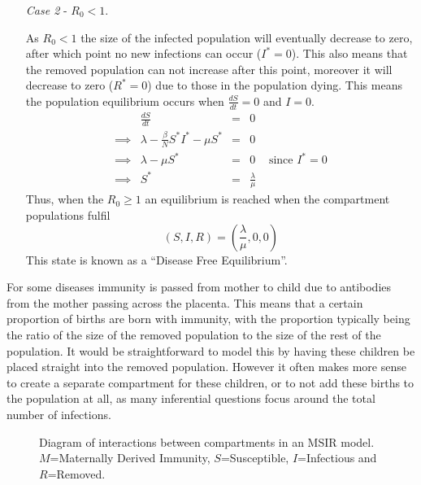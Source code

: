 \documentclass[11pt,a4paper]{article}
\theoremstyle{break}
\begin{document}
\begin{box_remark}
\begin{itemize}
      \item[\textit{Case 2}] - $R_0<1$.
      \par As $R_0<1$ the size of the infected population will eventually decrease to zero, after which point no new infections can occur ($I^*=0$). This also means that the removed population can not increase after this point, moreover it will decrease to zero ($R^*=0$) due to those in the population dying. This means the population equilibrium occurs when $\frac{dS}{dt}=0$ and $I=0$.
      \[\begin{array}{rrcll}
        &\frac{dS}{dt}&=&0\\
        \implies&\lambda-\frac\beta{N} S^*I^*-\mu S^*&=&0&\\
        \implies&\lambda-\mu S^*&=&0&\text{ since }I^*=0\\
        \implies&S^*&=&\frac\lambda\mu
      \end{array}\]
      Thus, when the $R_0\geq1$ an equilibrium is reached when the compartment populations fulfil
      \[ (S,I,R)=\left(\frac\lambda\mu,0,0\right) \]
      This state is known as a ``Disease Free Equilibrium''.
    \end{itemize}
  \end{box_remark}

  \par For some diseases immunity is passed from mother to child due to antibodies from the mother passing across the placenta. This means that a certain proportion of births are born with immunity, with the proportion typically being the ratio of the size of the removed population to the size of the rest of the population. It would be straightforward to model this by having these children be placed straight into the removed population. However it often makes more sense to create a separate compartment for these children, or to not add these births to the population at all, as many inferential questions focus around the total number of infections.

  \begin{figure}[H]
    \centering
    \caption{Diagram of interactions between compartments in an MSIR model. $M$=Maternally Derived Immunity, $S$=Susceptible, $I$=Infectious and $R$=Removed.}
    \label{fig_msir_model_diagram}
  \end{figure}
\end{document}
